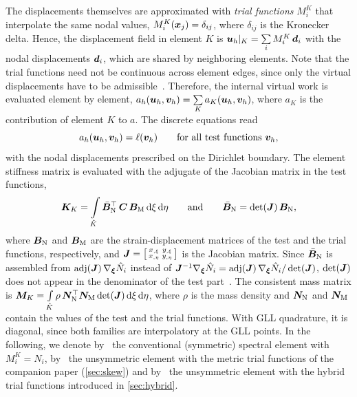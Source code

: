 The displacements themselves are approximated with \emph{trial functions} $M_i^K$ that interpolate the same nodal values, $M_i^K(\bm{x}_j)=\delta_{ij}$, where $\delta_{ij}$ is the Kronecker delta. Hence, the displacement field in element $K$ is $\bm{u}_h|_K=\sum\limits_{i}M_i^K\,\bm{d}_i$ with the nodal displacements $\bm{d}_i$, which are shared by neighboring elements. Note that the trial functions need not be continuous across element edges, since only the virtual displacements have to be admissible~\cite{Rajendran2003novel}. Therefore, the internal virtual work is evaluated element by element, $a_h(\bm{u}_h,\bm{v}_h)=\sum\limits_{K}a_K(\bm{u}_h,\bm{v}_h)$, where $a_K$ is the contribution of element $K$ to $a$. The discrete equations read
%
\begin{equation}
  a_h(\bm{u}_h,\bm{v}_h)=\ell(\bm{v}_h)\qquad\text{for all test functions }\bm{v}_h ,
  \label{eq:pg}
\end{equation}
%
with the nodal displacements prescribed on the Dirichlet boundary. The element stiffness matrix is evaluated with the adjugate of the Jacobian matrix in the test functions,
%
\begin{equation}
  \bm{K}_K=\int\limits_{\hat K}\bar{\bm{B}}_{\mathrm N}^\top\,\bm{C}\,\bm{B}_{\mathrm M}\mathop{}\!\mathrm{d}\xi\mathop{}\!\mathrm{d}\eta\qquad\text{and}\qquad
  \bar{\bm{B}}_{\mathrm N}=\det(\bm{J})\,\bm{B}_{\mathrm N} ,
  \label{eq:Ke}
\end{equation}
%
where $\bm{B}_{\mathrm N}$ and $\bm{B}_{\mathrm M}$ are the strain-displacement matrices of the test and the trial functions, respectively, and $\bm{J}=\bigl[\begin{smallmatrix}x_{,\xi}&y_{,\xi}\\x_{,\eta}&y_{,\eta}\end{smallmatrix}\bigr]$ is the Jacobian matrix. Since $\bar{\bm{B}}_{\mathrm N}$ is assembled from $\operatorname{adj}(\bm{J})\,\nabla_{\bm\xi}\hat N_i$ instead of $\bm{J}^{-1}\nabla_{\bm\xi}\hat N_i=\operatorname{adj}(\bm{J})\,\nabla_{\bm\xi}\hat N_i/\det(\bm{J})$, $\det(\bm{J})$ does not appear in the denominator of the test part~\cite{Rajendran2010technique}. The consistent mass matrix is $\bm{M}_K=\int\limits_{\hat K}\rho\,\bm{N}_{\mathrm N}^\top\bm{N}_{\mathrm M}\det(\bm{J})\mathop{}\!\mathrm{d}\xi\mathop{}\!\mathrm{d}\eta$, where $\rho$ is the mass density and $\bm{N}_{\mathrm N}$ and $\bm{N}_{\mathrm M}$ contain the values of the test and the trial functions. With GLL quadrature, it is diagonal, since both families are interpolatory at the GLL points. In the following, we denote by \PP\ the conventional (symmetric) spectral element with $M_i^K=N_i$, by \PM\ the unsymmetric element with the metric trial functions of the companion paper (\cref{sec:skew}) and by \PH\ the unsymmetric element with the hybrid trial functions introduced in \cref{sec:hybrid}.
%
